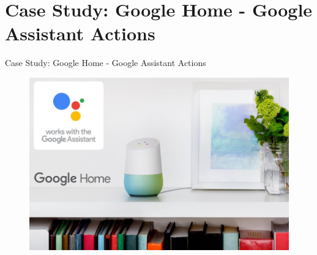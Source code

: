 \documentclass{beamer}
\begin{document}
\section{Case Study: Google Home - Google Assistant Actions}

\begin{frame}
\begin{center} 
	 Case Study: Google Home - Google Assistant Actions
\end{center}

\begin{figure}
	\centering
	\includegraphics[width=1\linewidth]{images/Google-Home1}
	\label{fig:maxresdefault}
\end{figure}

\end{frame}
\end{document}
